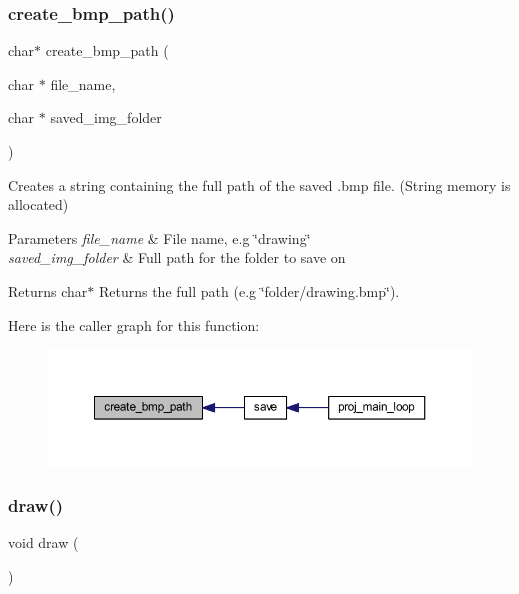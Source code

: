 \subsubsection{\texorpdfstring{create\+\_\+bmp\+\_\+path()}{create\_bmp\_path()}}
{\footnotesize\ttfamily char$\ast$ create\+\_\+bmp\+\_\+path (\begin{DoxyParamCaption}\item[{char $\ast$}]{file\+\_\+name,  }\item[{char $\ast$}]{saved\+\_\+img\+\_\+folder }\end{DoxyParamCaption})}



Creates a string containing the full path of the saved .bmp file. (String memory is allocated) 


\begin{DoxyParams}{Parameters}
{\em file\+\_\+name} & File name, e.\+g \char`\"{}drawing\char`\"{} \\
\hline
{\em saved\+\_\+img\+\_\+folder} & Full path for the folder to save on \\
\hline
\end{DoxyParams}
\begin{DoxyReturn}{Returns}
char$\ast$ Returns the full path (e.\+g \char`\"{}folder/drawing.\+bmp\char`\"{}). 
\end{DoxyReturn}
Here is the caller graph for this function\+:\nopagebreak
\begin{figure}[H]
\begin{center}
\leavevmode
\includegraphics[width=350pt]{group__pengoo_ga0c383f0cb382ef07b72894184255e49f_icgraph}
\end{center}
\end{figure}
\mbox{\label{group__pengoo_ga56c5cf8a568cff737ff95520cbe6b405}} 
\subsubsection{\texorpdfstring{draw()}{draw()}}
{\footnotesize\ttfamily void draw (\begin{DoxyParamCaption}{ }\end{DoxyParamCaption})}



